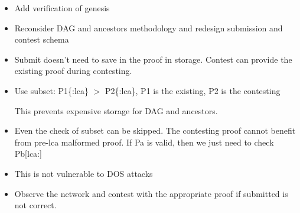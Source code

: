 \begin{itemize}

    \item
        Add verification of genesis
    \item
        Reconsider DAG and ancestors methodology and redesign submission and
        contest schema
    \item
        Submit doesn't need to save in the proof in storage. Contest can
        provide the existing proof during contesting.

    \item
        Use subset: P1\{:lca\} $>$ P2\{:lca\}, P1 is the existing, P2 is the
        contesting

        This prevents expensive storage for DAG and ancestors.

    \item
        Even the check of subset can be skipped. The contesting proof cannot
        benefit from pre-lca malformed proof. If Pa is valid, then we just
        need to check Pb[lca:]

    \item
        This is not vulnerable to DOS attacks

    \item
        Observe the network and contest with the appropriate proof if
        submitted is not correct.

\end{itemize}

\pagebreak
